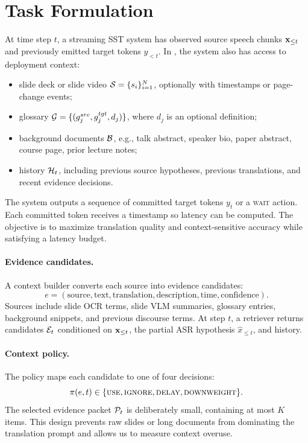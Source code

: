 \section{Task Formulation}

At time step $t$, a streaming SST system has observed source speech chunks $\mathbf{x}_{\leq t}$ and previously emitted target tokens $y_{<t}$.  In \taskname, the system also has access to deployment context:
\begin{itemize}[leftmargin=*]
    \item slide deck or slide video $\mathcal{S} = \{s_i\}_{i=1}^{N}$, optionally with timestamps or page-change events;
    \item glossary $\mathcal{G} = \{(g_j^{src}, g_j^{tgt}, d_j)\}$, where $d_j$ is an optional definition;
    \item background documents $\mathcal{B}$, e.g., talk abstract, speaker bio, paper abstract, course page, prior lecture notes;
    \item history $\mathcal{H}_t$, including previous source hypotheses, previous translations, and recent evidence decisions.
\end{itemize}

The system outputs a sequence of committed target tokens $y_t$ or a \textsc{wait} action.  Each committed token receives a timestamp so latency can be computed.  The objective is to maximize translation quality and context-sensitive accuracy while satisfying a latency budget.

\paragraph{Evidence candidates.}
A context builder converts each source into evidence candidates:
\begin{equation}
    e = (\mathrm{source}, \mathrm{text}, \mathrm{translation}, \mathrm{description}, \mathrm{time}, \mathrm{confidence}).
\end{equation}
Sources include slide OCR terms, slide VLM summaries, glossary entries, background snippets, and previous discourse terms.  At step $t$, a retriever returns candidates $\mathcal{E}_t$ conditioned on $\mathbf{x}_{\leq t}$, the partial ASR hypothesis $\hat{x}_{\leq t}$, and history.

\paragraph{Context policy.}
The policy maps each candidate to one of four decisions:
\begin{equation}
    \pi(e, t) \in \{\textsc{use}, \textsc{ignore}, \textsc{delay}, \textsc{downweight}\}.
\end{equation}
The selected evidence packet $\mathcal{P}_t$ is deliberately small, containing at most $K$ items.  This design prevents raw slides or long documents from dominating the translation prompt and allows us to measure context overuse.

